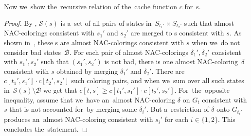 Now we~show the~recursive relation of the~cache function \( c \) for~\JoinNode{}s.
%
%
%
\begin{proof}
	By ,
	\( \mathcal{S}(s) \) is a~set of
	all pairs of states in~\( S_{t_1'} \times S_{t_2'} \)
	such that almost NAC-colorings consistent with \( s_1' \) and \( s_2' \)
	are merged to \rbcol{}s consistent with \( s \).
	As shown in~,
	these \rbcol{}s are almost NAC-colorings consistent with \( s \)
	when we~do not consider bad states~\( \mathcal{B} \).
	For each pair of almost NAC-colorings \( \delta_1', \delta_2' \)
	consistent with \( s_1', s_2' \) such that \( (s_1', s_2') \) is not bad,
	there is one almost NAC-coloring~\( \delta \) consistent with \( s \)
	obtained by merging \( \delta_1' \) and \( \delta_2' \).
	There are \( c[t_1', s_1'] \cdot c[t_2', s_2'] \) such coloring pairs, and
	when we~sum over all such states in~\( \mathcal{S}(s) \setminus \mathcal{B} \)
	we get that \( c[t, s] \ge c[t_1', s_1'] \cdot c[t_2', s_2'] \).
	For~the~opposite inequality, assume that we~have
	an~almost NAC-coloring \( \delta \) on \( G_t \) consistent with \( s \)
	that is not accounted for~by merging some \( \delta_i' \).
	But a~restriction of \( \delta \) onto \( G_{t_i'} \) produces an~almost NAC-coloring
	consistent with \( s_i' \) for each \( i \in \{1,2\} \).
	This concludes the~statement.
\end{proof}
%

